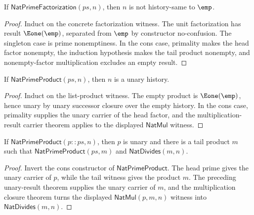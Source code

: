 \begin{theorem}
\label{thm:nat-prime-factorization-result-not-empty}
If \(\mathsf{NatPrimeFactorization}(ps,n)\), then \(n\) is not history-same
to \(\emp\).
\end{theorem}
\begin{proof}
Induct on the concrete factorization witness. The unit factorization has
result \(\Eone(\emp)\), separated from \(\emp\) by constructor no-confusion.
The singleton case is prime nonemptiness. In the cons case, primality makes
the head factor nonempty, the induction hypothesis makes the tail product
nonempty, and nonempty-factor multiplication excludes an empty result.
\end{proof}

\begin{theorem}
\label{thm:nat-prime-product-result-unary}
If \(\mathsf{NatPrimeProduct}(ps,n)\), then \(n\) is a unary history.
\end{theorem}
\begin{proof}
Induct on the list-product witness. The empty product is \(\Eone(\emp)\),
hence unary by unary successor closure over the empty history. In the cons
case, primality supplies the unary carrier of the head factor, and the
multiplication-result carrier theorem applies to the displayed
\(\mathsf{NatMul}\) witness.
\end{proof}

\begin{theorem}
\label{thm:nat-prime-product-cons-tail-divides}
If \(\mathsf{NatPrimeProduct}(p::ps,n)\), then \(p\) is unary and there is a
tail product \(m\) such that \(\mathsf{NatPrimeProduct}(ps,m)\) and
\(\mathsf{NatDivides}(m,n)\).
\end{theorem}
\begin{proof}
Invert the cons constructor of \(\mathsf{NatPrimeProduct}\). The head prime
gives the unary carrier of \(p\), while the tail witness gives the product
\(m\). The preceding unary-result theorem supplies the unary carrier of \(m\),
and the multiplication closure theorem turns the displayed
\(\mathsf{NatMul}(p,m,n)\) witness into \(\mathsf{NatDivides}(m,n)\).
\end{proof}

